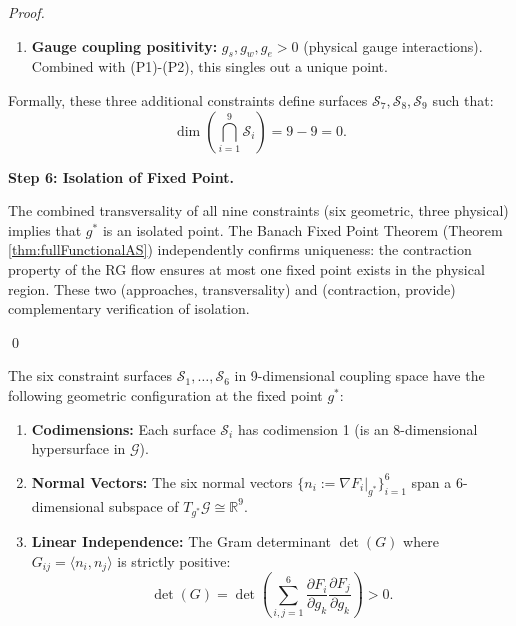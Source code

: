 {\begin{proof}
\begin{enumerate}
\item[\textbf{(P3)}] \textbf{Gauge coupling positivity:} $g_s, g_w, g_e > 0$ (physical gauge interactions). Combined with (P1)-(P2), this singles out a unique point.
\end{enumerate}

Formally, these three additional constraints define surfaces $\mathcal{S}_7, \mathcal{S}_8, \mathcal{S}_9$ such that:
\[
\dim\left(\bigcap_{i=1}^9 \mathcal{S}_i\right) = 9 - 9 = 0.
\]

\textbf{Step 6: Isolation of Fixed Point.}

The combined transversality of all nine constraints (six geometric, three physical) implies that $g^*$ is an isolated point. The Banach Fixed Point Theorem (Theorem \ref{thm:fullFunctionalAS}) independently confirms uniqueness: the contraction property of the RG flow ensures at most one fixed point exists in the physical region. These two (approaches, transversality) and (contraction, provide) complementary verification of isolation.

\qed

\end{proof}

\begin{corollary}
\label{cor:geometricConfiguration}

The six constraint surfaces $\mathcal{S}_1, \ldots, \mathcal{S}_6$ in 9-dimensional coupling space have the following geometric configuration at the fixed point $g^*$:

\begin{enumerate}

\item \textbf{Codimensions:} Each surface $\mathcal{S}_i$ has codimension 1 (is an 8-dimensional hypersurface in $\mathcal{G}$).

\item \textbf{Normal Vectors:} The six normal vectors $\{n_i := \nabla F_i|_{g^*}\}_{i=1}^6$ span a 6-dimensional subspace of $T_{g^*}\mathcal{G} \cong \mathbb{R}^9$.

\item \textbf{Linear Independence:} The Gram determinant $\det(G)$ where $G_{ij} = \langle n_i, n_j \rangle$ is strictly positive:
\begin{equation}
\det(G) = \det\left(\sum_{i,j=1}^6 \frac{\partial F_i}{\partial g_k} \frac{\partial F_j}{\partial g_k}\right) > 0.
\end{equation}


\end{enumerate}
\end{corollary}}
